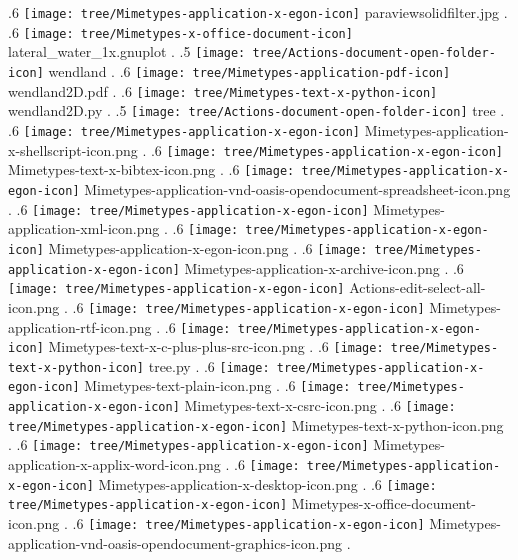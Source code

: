 {.6 { \texttt{[image: tree/Mimetypes-application-x-egon-icon]} paraviewsolidfilter.jpg }.
.6 { \texttt{[image: tree/Mimetypes-x-office-document-icon]} lateral\_water\_1x.gnuplot }.
.5 { \texttt{[image: tree/Actions-document-open-folder-icon]} wendland }.
.6 { \texttt{[image: tree/Mimetypes-application-pdf-icon]} wendland2D.pdf }.
.6 { \texttt{[image: tree/Mimetypes-text-x-python-icon]} wendland2D.py }.
.5 { \texttt{[image: tree/Actions-document-open-folder-icon]} tree }.
.6 { \texttt{[image: tree/Mimetypes-application-x-egon-icon]} Mimetypes-application-x-shellscript-icon.png }.
.6 { \texttt{[image: tree/Mimetypes-application-x-egon-icon]} Mimetypes-text-x-bibtex-icon.png }.
.6 { \texttt{[image: tree/Mimetypes-application-x-egon-icon]} Mimetypes-application-vnd-oasis-opendocument-spreadsheet-icon.png }.
.6 { \texttt{[image: tree/Mimetypes-application-x-egon-icon]} Mimetypes-application-xml-icon.png }.
.6 { \texttt{[image: tree/Mimetypes-application-x-egon-icon]} Mimetypes-application-x-egon-icon.png }.
.6 { \texttt{[image: tree/Mimetypes-application-x-egon-icon]} Mimetypes-application-x-archive-icon.png }.
.6 { \texttt{[image: tree/Mimetypes-application-x-egon-icon]} Actions-edit-select-all-icon.png }.
.6 { \texttt{[image: tree/Mimetypes-application-x-egon-icon]} Mimetypes-application-rtf-icon.png }.
.6 { \texttt{[image: tree/Mimetypes-application-x-egon-icon]} Mimetypes-text-x-c-plus-plus-src-icon.png }.
.6 { \texttt{[image: tree/Mimetypes-text-x-python-icon]} tree.py }.
.6 { \texttt{[image: tree/Mimetypes-application-x-egon-icon]} Mimetypes-text-plain-icon.png }.
.6 { \texttt{[image: tree/Mimetypes-application-x-egon-icon]} Mimetypes-text-x-csrc-icon.png }.
.6 { \texttt{[image: tree/Mimetypes-application-x-egon-icon]} Mimetypes-text-x-python-icon.png }.
.6 { \texttt{[image: tree/Mimetypes-application-x-egon-icon]} Mimetypes-application-x-applix-word-icon.png }.
.6 { \texttt{[image: tree/Mimetypes-application-x-egon-icon]} Mimetypes-application-x-desktop-icon.png }.
.6 { \texttt{[image: tree/Mimetypes-application-x-egon-icon]} Mimetypes-x-office-document-icon.png }.
.6 { \texttt{[image: tree/Mimetypes-application-x-egon-icon]} Mimetypes-application-vnd-oasis-opendocument-graphics-icon.png }.
}
